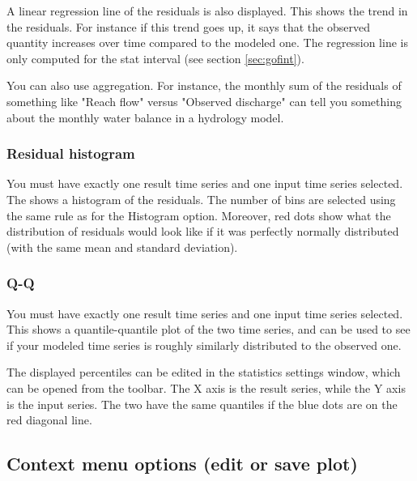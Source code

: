 \documentclass[11pt]{article}
\theoremstyle{definition}
\begin{document}
A linear regression line of the residuals is also displayed. This shows the trend in the residuals. For instance if this trend goes up, it says that the observed quantity increases over time compared to the modeled one. The regression line is only computed for the stat interval (see section \ref{sec:gofint}).

You can also use aggregation. For instance, the monthly sum of the residuals of something like "Reach flow" versus "Observed discharge" can tell you something about the monthly water balance in a hydrology model.

\subsubsection{Residual histogram}

You must have exactly one result time series and one input time series selected. The shows a histogram of the residuals. The number of bins are selected using the same rule as for the Histogram option. Moreover, red dots show what the distribution of residuals would look like if it was perfectly normally distributed (with the same mean and standard deviation).

\subsubsection{Q-Q}

You must have exactly one result time series and one input time series selected. This shows a quantile-quantile plot of the two time series, and can be used to see if your modeled time series is roughly similarly distributed to the observed one.

The displayed percentiles can be edited in the statistics settings window, which can be opened from the toolbar. The X axis is the result series, while the Y axis is the input series. The two have the same quantiles if the blue dots are on the red diagonal line.

\subsection{Context menu options (edit or save plot)}
\end{document}
